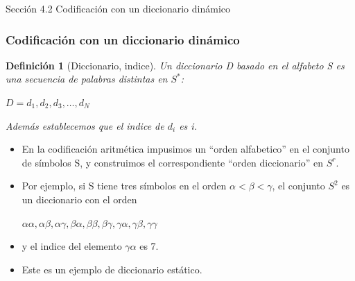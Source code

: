 \documentclass{beamer}
\theoremstyle{plain}
\newtheorem{definicion} [Definicion]{Definición}
\theoremstyle{example}
\theoremstyle{example}
\begin{document}
\begin{frame}   \footnotesize
{
\begin{block}{Sección 4.2}
Codificación con un diccionario dinámico
\end{block}
}
\end{frame} 
\begin{frame} \frametitle{Codificación con un diccionario dinámico} \footnotesize 

\begin{definicion} [Diccionario, indice]
Un diccionario D basado en el alfabeto S es una secuencia de palabras distintas en $S^*$:
\begin{center}
$D = d_1,d_2,d_3, \ldots ,d_N$
\end{center}
Además establecemos que el indice de $d_i$ es i.
\end{definicion}

\begin{itemize}
\item En la codificación aritmética impusimos un ``orden alfabetico'' en el conjunto de símbolos S, y construimos el correspondiente ``orden diccionario'' en $S^r$. 


\item  Por ejemplo, si S tiene tres símbolos en el orden $\alpha < \beta < \gamma$, el conjunto $S^2$ es un diccionario con el orden 

	\begin{center}
$\alpha\alpha , \alpha\beta, \alpha\gamma , \beta\alpha, \beta\beta, \beta\gamma, \gamma\alpha, \gamma\beta, \gamma\gamma$
\end{center}

\item  y el indice del elemento $\gamma\alpha$ es 7.  

\item Este es un ejemplo de diccionario estático. 
\end{itemize}

\end{frame} 
\end{document}
